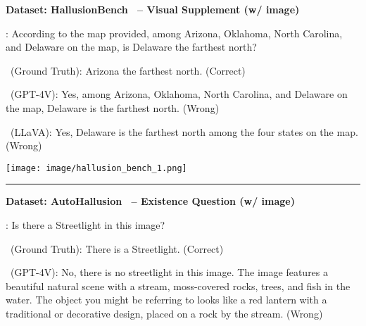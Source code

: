 \begin{boxK}
\textbf{Dataset: HallusionBench~\cite{HallusionBench} -- Visual Supplement (w/ image)}


\begin{minipage}{0.75\linewidth}
\user: According to the map provided, among Arizona, Oklahoma, North Carolina, and Delaware on the map, is Delaware the farthest north?

\robot\ (Ground Truth): Arizona the farthest north. (\textcolor{green!50!black}{Correct})

\robot\ (GPT-4V): Yes, among Arizona, Oklahoma, North Carolina, and Delaware on the map, Delaware is the farthest north. (\textcolor{red!50!black}{Wrong})

\robot\ (LLaVA): Yes, Delaware is the farthest north among the four states on the map. (\textcolor{red!50!black}{Wrong})

\end{minipage}\hfill
\begin{minipage}{0.22\linewidth}
    \centering
    \texttt{[image: image/hallusion\_bench\_1.png]} 
\end{minipage}





\vspace{2pt}
\hrule
\vspace{2pt}

\textbf{Dataset: AutoHallusion~\cite{AutoHallusion} -- Existence Question (w/ image)}

\begin{minipage}{0.75\linewidth}

\user: Is there a Streetlight in this image?

\robot\ (Ground Truth): There is a Streetlight. (\textcolor{green!50!black}{Correct})

\robot\ (GPT-4V): No, there is no streetlight in this image. The image features a beautiful natural scene with a stream, moss-covered rocks, trees, and fish in the water. The object you might be referring to looks like a red lantern with a traditional or decorative design, placed on a rock by the stream. (\textcolor{red!50!black}{Wrong})


\end{minipage}
\end{boxK}
